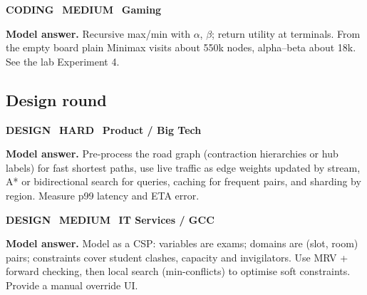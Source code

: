 \documentclass[11pt]{article}
\begin{document}
\begin{tcolorbox}[enhanced,breakable,colback=white,colframe=navyL,arc=2mm,boxrule=0.8pt,left=3mm,right=3mm,
 title={\textbf{QII.09}\quad Write Minimax with alpha--beta for Tic-Tac-Toe and report nodes visited.},fonttitle=\color{white}\small,colbacktitle=navyL]
\colorbox{navyL!15}{\scriptsize\bfseries\color{navyL} CODING}\
\colorbox{gold!85!black!15}{\scriptsize\bfseries\color{gold!85!black} MEDIUM}\
\colorbox{navy!8}{\scriptsize\bfseries\color{navy} Gaming}\par\smallskip
\textbf{\color{navy}Model answer.} Recursive max/min with $\alpha$, $\beta$; return utility at terminals. From the empty board plain Minimax visits about 550k nodes, alpha--beta about 18k. See the lab Experiment 4.
\end{tcolorbox}
\subsection*{\color{crimson}Design round}
\begin{tcolorbox}[enhanced,breakable,colback=white,colframe=crimson,arc=2mm,boxrule=0.8pt,left=3mm,right=3mm,
 title={\textbf{QII.10}\quad Design the route engine for a ride-hailing app serving a city of 10 million people.},fonttitle=\color{white}\small,colbacktitle=crimson]
\colorbox{crimson!15}{\scriptsize\bfseries\color{crimson} DESIGN}\
\colorbox{crimson!15}{\scriptsize\bfseries\color{crimson} HARD}\
\colorbox{navy!8}{\scriptsize\bfseries\color{navy} Product / Big Tech}\par\smallskip
\textbf{\color{navy}Model answer.} Pre-process the road graph (contraction hierarchies or hub labels) for fast shortest paths, use live traffic as edge weights updated by stream, A* or bidirectional search for queries, caching for frequent pairs, and sharding by region. Measure p99 latency and ETA error.
\end{tcolorbox}
\begin{tcolorbox}[enhanced,breakable,colback=white,colframe=crimson,arc=2mm,boxrule=0.8pt,left=3mm,right=3mm,
 title={\textbf{QII.11}\quad Design an exam-timetabling system for a university.},fonttitle=\color{white}\small,colbacktitle=crimson]
\colorbox{crimson!15}{\scriptsize\bfseries\color{crimson} DESIGN}\
\colorbox{gold!85!black!15}{\scriptsize\bfseries\color{gold!85!black} MEDIUM}\
\colorbox{navy!8}{\scriptsize\bfseries\color{navy} IT Services / GCC}\par\smallskip
\textbf{\color{navy}Model answer.} Model as a CSP: variables are exams; domains are (slot, room) pairs; constraints cover student clashes, capacity and invigilators. Use MRV + forward checking, then local search (min-conflicts) to optimise soft constraints. Provide a manual override UI.
\end{tcolorbox}
\end{document}
